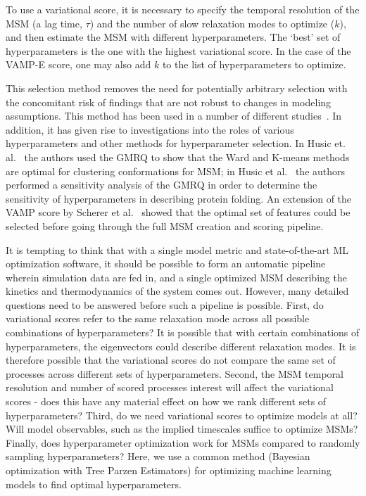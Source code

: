 \documentclass[journal=jacsat,manuscript=article]{achemso}
\begin{document}
To use a variational score, it is necessary to specify the temporal resolution of the MSM (a lag time, $\tau$) and the number of slow relaxation modes to optimize ($k$), and then estimate the MSM with different hyperparameters. The `best' set of hyperparameters is the one with the highest variational score. In the case of the VAMP-E score, one may also add $k$ to the list of hyperparameters to optimize. 

This selection method removes the need for potentially arbitrary selection with the concomitant risk of findings that are not robust to changes in modeling assumptions. This method has been used in a number of different studies~\cite{A_Minimum_2018, Adaptive_M2020, High-Resol2019, Maximizing2018, Modeling_t2017, Optimized_2016, Quantitati2018, VAMPnets_f2018, Variationa2018, Ward_Clust2017}. In addition, it has given rise to investigations into the roles of various hyperparameters and other methods for hyperparameter selection. In Husic et. al.~
\cite{Ward_Clust2017} the authors used the GMRQ to show that the Ward and K-means methods are optimal for clustering conformations for MSM; in Husic et al.~\cite{Optimized_2016} the authors performed a sensitivity analysis of the GMRQ  in order to determine the sensitivity of hyperparameters in describing protein folding.  An extension of the VAMP score by Scherer et al.~\cite{scherer_variational_2019} showed that the optimal set of features could be selected before going through the full MSM creation and scoring pipeline.  

It is tempting to think that with a single model metric and state-of-the-art ML optimization software, it should be possible to form an automatic pipeline wherein simulation data are fed in, and a single optimized MSM describing the kinetics and thermodynamics of the system comes out. However, many detailed questions need to be answered before such a pipeline is possible. First, do variational scores refer to the same relaxation mode across all possible combinations of hyperparameters?  It is possible that with certain combinations of hyperparameters, the eigenvectors could describe different relaxation modes. It is therefore possible that the variational scores do not compare the same set of processes across different sets of hyperparameters. Second, the MSM temporal resolution and number of scored processes interest will affect the variational scores - does this have any material effect on how we rank different sets of hyperparameters? Third, do we need variational scores to optimize models at all?  Will model observables, such as the implied timescales suffice to optimize MSMs?  Finally, does hyperparameter optimization work for MSMs compared to randomly sampling hyperparameters?  Here, we use a common method (Bayesian optimization with Tree Parzen Estimators) for optimizing machine learning models to find optimal hyperparameters. 
\end{document}
